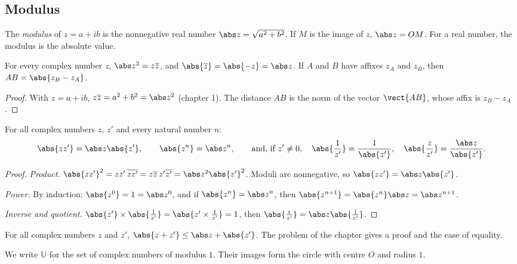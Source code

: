 \subsection{Modulus}
\begin{definition}[Modulus]
The \emph{modulus} of $z=a+ib$ is the nonnegative real number $\abs z=\sqrt{a^2+b^2}$. If $M$ is the image of $z$, $\abs z=OM$. For a real number, the modulus is the absolute value.
\end{definition}
\begin{theorem}
For every complex number $z$, $\abs z^2=z\overline z$, and $\abs{\overline z}=\abs{-z}=\abs z$. If $A$ and $B$ have affixes $z_A$ and $z_B$, then $AB=\abs{z_B-z_A}$.
\end{theorem}
\begin{proof}
With $z=a+ib$, $z\overline z=a^2+b^2=\abs z^2$ (chapter 1). The distance $AB$ is the norm of the vector $\vect{AB}$, whose affix is $z_B-z_A$.
\end{proof}
\begin{theorem}
For all complex numbers $z$, $z'$ and every natural number $n$:
\[\abs{zz'}=\abs z\abs{z'},\qquad\abs{z^n}=\abs z^n,\qquad\text{and, if }z'\neq0,\quad\abs{\frac1{z'}}=\frac1{\abs{z'}},\quad\abs{\frac z{z'}}=\frac{\abs z}{\abs{z'}}.\]
\end{theorem}
\begin{proof}
\emph{Product.} $\abs{zz'}^2=zz'\,\overline{zz'}=z\overline z\,z'\overline{z'}=\abs z^2\abs{z'}^2$. Moduli are nonnegative, so $\abs{zz'}=\abs z\abs{z'}$.\par
\emph{Power.} By induction: $\abs{z^0}=1=\abs z^0$, and if $\abs{z^n}=\abs z^n$, then $\abs{z^{n+1}}=\abs{z^n}\abs z=\abs z^{n+1}$.\par
\emph{Inverse and quotient.} $\abs{z'}\times\abs{\frac1{z'}}=\abs{z'\times\frac1{z'}}=1$, then $\abs{\frac z{z'}}=\abs z\abs{\frac1{z'}}$.
\end{proof}
\begin{theorem}
For all complex numbers $z$ and $z'$, $\abs{z+z'}\le\abs z+\abs{z'}$. The problem of the chapter gives a proof and the case of equality.
\end{theorem}
\begin{definition}
We write $\mathbb U$ for the set of complex numbers of modulus $1$. Their images form the circle with centre $O$ and radius $1$.
\end{definition}
